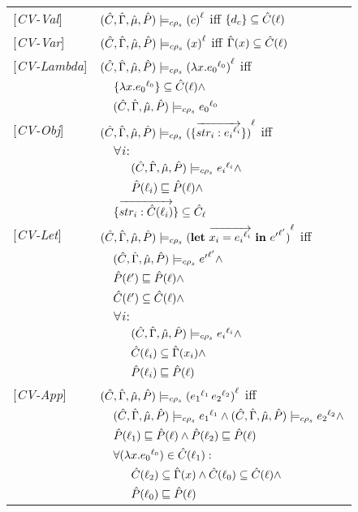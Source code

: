 \begin{tabular}{l l l l}
{[\textit{CV-Val}]}&\multicolumn{3}{l}{$ \ccestl {c} $ iff $\{d_c\} \subseteq \Cat(\ell)$} \\ 
{[\textit{CV-Var}]}&\multicolumn{3}{l}{$ \ccestl {x} $ iff $\Env(x) \subseteq \Cat(\ell)$} \\ 
{[\textit{CV-Lambda}]}&\multicolumn{3}{l}{$ \ccestl {\lam{x}{\lbt 0}} $ iff}\\
&&\multicolumn{2}{l}{$\{\lam{x}{\lbt 0}\} \subseteq \Cat(\ell) \wedge $}\\
&&\multicolumn{2}{l}{$ \ccest {\lbt 0}$}\\
{[\textit{CV-Obj}]}&\multicolumn{3}{l}{$ \ccestl {\rec{\vec{str_i : \lbt i}}}$ iff}\\
&&\multicolumn{2}{l}{$\forall i:$}\\
&&&$\ccest {\lbt i} \wedge$\\
&&&$\Pat(\ell_i) \sqsubseteq \Pat(\ell) \wedge$\\ 
&&\multicolumn{2}{l}{$\rec{\vec{str_i : \Cat(\ell_i)}} \subseteq \Cat_\ell $} \\
{[\textit{CV-Let}]}&\multicolumn{3}{l}{$ \ccestl {\letexprs{x_i}{\lbt i}{{e'}^{\ell'}}}$ iff}\\
&&\multicolumn{2}{l}{$ \ccest {{e'}^{\ell'}} \wedge$} \\
&&\multicolumn{2}{l}{$ \Pat(\ell') \sqsubseteq \Pat(\ell) \wedge$}\\
&&\multicolumn{2}{l}{$ \Cat(\ell') \subseteq \Cat(\ell) \wedge$}\\
&&\multicolumn{2}{l}{$ \forall i:$}\\
&&&$\ccest {{e_i}^{\ell_i}} \wedge$ \\
&&& $ \Cat(\ell_i) \subseteq \Env(x_i) \wedge$ \\
&&& $ \Pat(\ell_i) \sqsubseteq \Pat(\ell) $ \\
{[\textit{CV-App}]}&\multicolumn{3}{l}{$ \ccestl {\appl {\lbt 1} {\lbt 2}}$ iff}\\
&&\multicolumn{2}{l}{$\ccest {\lbt 1} \wedge \ccest {\lbt 2} \wedge$} \\
&&\multicolumn{2}{l}{$\Pat(\ell_1) \sqsubseteq \Pat(\ell) \wedge \Pat(\ell_2) \sqsubseteq \Pat(\ell)$} \\
&&\multicolumn{2}{l}{$\forall (\lam{x}{\lbt 0}) \in \Cat(\ell_1) :$}\\
&&&$\Cat(\ell_2) \subseteq \Env(x) \wedge \Cat(\ell_0) \subseteq \Cat(\ell) \wedge$\\
&&&$\Pat(\ell_0) \sqsubseteq \Pat(\ell) $\\

\end{tabular}
